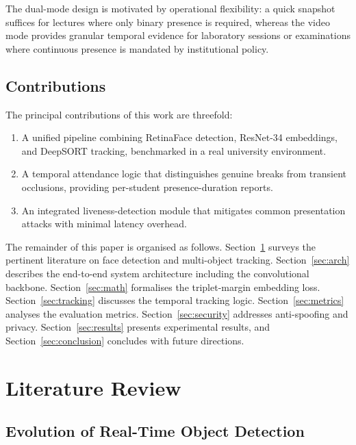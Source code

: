\documentclass[conference, 10pt]{IEEEtran}
\begin{document}
The dual-mode design is motivated by operational flexibility: a quick snapshot suffices for
lectures where only binary presence is required, whereas the video mode provides granular
temporal evidence for laboratory sessions or examinations where continuous presence is
mandated by institutional policy.

\subsection{Contributions}

The principal contributions of this work are threefold:
\begin{enumerate}
    \item A unified pipeline combining RetinaFace detection, ResNet-34 embeddings, and
          DeepSORT tracking, benchmarked in a real university environment.
    \item A temporal attendance logic that distinguishes genuine breaks from transient
          occlusions, providing per-student presence-duration reports.
    \item An integrated liveness-detection module that mitigates common presentation attacks
          with minimal latency overhead.
\end{enumerate}

The remainder of this paper is organised as follows.  Section~\ref{sec:litreview} surveys the
pertinent literature on face detection and multi-object tracking.  Section~\ref{sec:arch}
describes the end-to-end system architecture including the convolutional backbone.
Section~\ref{sec:math} formalises the triplet-margin embedding loss.
Section~\ref{sec:tracking} discusses the temporal tracking logic.  Section~\ref{sec:metrics}
analyses the evaluation metrics.  Section~\ref{sec:security} addresses anti-spoofing and
privacy.  Section~\ref{sec:results} presents experimental results, and
Section~\ref{sec:conclusion} concludes with future directions.


\section{Literature Review}
\label{sec:litreview}

\subsection{Evolution of Real-Time Object Detection}
\end{document}
